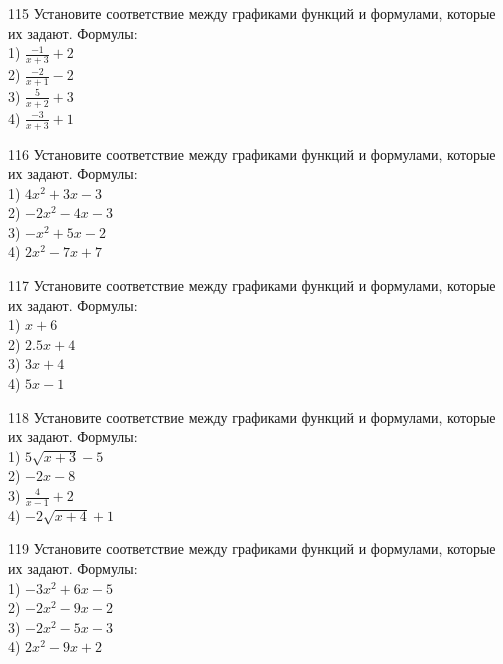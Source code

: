 \documentclass[4apaper]{article}
\begin{document}
\begin{taskBN}{115}
Установите соответствие между графиками функций и формулами, которые их задают. Формулы: \\1) $\frac{-1}{x+3}+2$\\2) $\frac{-2}{x+1}-2$\\3) $\frac{5}{x+2}+3$\\4) $\frac{-3}{x+3}+1$
\end{taskBN}

\begin{taskBN}{116}
Установите соответствие между графиками функций и формулами, которые их задают. Формулы: \\1) $4x^2+3x-3$\\2) $-2x^2-4x-3$\\3) $-x^2+5x-2$\\4) $2x^2-7x+7$
\end{taskBN}

\begin{taskBN}{117}
Установите соответствие между графиками функций и формулами, которые их задают. Формулы: \\1) $x+6$\\2) $2.5x+4$\\3) $3x+4$\\4) $5x-1$
\end{taskBN}

\begin{taskBN}{118}
Установите соответствие между графиками функций и формулами, которые их задают. Формулы: \\1) $5\sqrt{x+3}-5$\\2) $-2x-8$\\3) $\frac{4}{x-1}+2$\\4) $-2\sqrt{x+4}+1$
\end{taskBN}

\begin{taskBN}{119}
Установите соответствие между графиками функций и формулами, которые их задают. Формулы: \\1) $-3x^2+6x-5$\\2) $-2x^2-9x-2$\\3) $-2x^2-5x-3$\\4) $2x^2-9x+2$
\end{taskBN}
\end{document}
